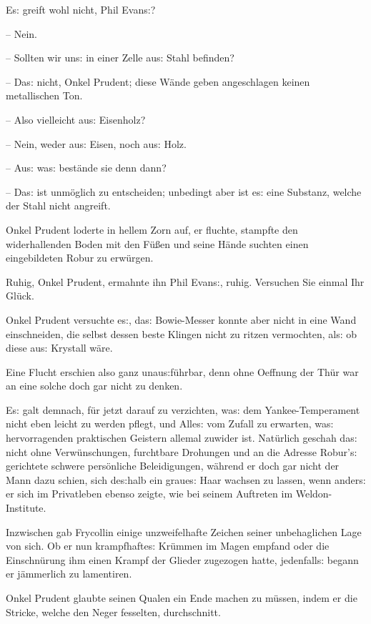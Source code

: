 \documentclass[oneside,12pt]{book}
\newcommand{\s}{s:}
\begin{document}
{\glqq}E{\s} greift wohl nicht, Phil Evan{\s}?

-- Nein.

-- Sollten wir un{\s} in einer Zelle au{\s} Stahl befinden?

-- Da{\s} nicht, Onkel Prudent; diese W\"ande geben angeschlagen
keinen metallischen Ton.

-- Also vielleicht au{\s} Eisenholz?

-- Nein, weder au{\s} Eisen, noch au{\s} Holz.

-- Au{\s} wa{\s} best\"ande sie denn dann?

-- Da{\s} ist unm\"oglich zu entscheiden; unbedingt aber ist e{\s}
eine Substanz, welche der Stahl nicht angreift.{\grqq}

Onkel Prudent loderte in hellem Zorn auf, er fluchte, stampfte den
widerhallenden Boden mit den F\"u{\ss}en und seine H\"ande suchten
einen eingebildeten Robur zu erw\"urgen.

{\glqq}Ruhig, Onkel Prudent, ermahnte ihn Phil Evan{\s}, ruhig.
Versuchen Sie einmal Ihr Gl\"uck.{\grqq}

Onkel Prudent versuchte e{\s}, da{\s} Bowie-Messer konnte aber nicht
in eine Wand einschneiden, die selbst dessen beste Klingen nicht zu
ritzen vermochten, al{\s} ob diese au{\s} Krystall w\"are.

Eine Flucht erschien also ganz unau{\s}f\"uhrbar, denn ohne Oeffnung
der Th\"ur war an eine solche doch gar nicht zu denken.

E{\s} galt demnach, f\"ur jetzt darauf zu verzichten, wa{\s} dem
Yankee-Temperament nicht eben leicht zu werden pflegt, und Alle{\s}
vom Zufall zu erwarten, wa{\s} hervorragenden praktischen Geistern
allemal zuwider ist. Nat\"urlich geschah da{\s} nicht ohne
Verw\"unschungen, furchtbare Drohungen und an die Adresse Robur'{\s}
gerichtete schwere pers\"onliche Beleidigungen, w\"ahrend er doch gar
nicht der Mann dazu schien, sich de{\s}halb ein graue{\s} Haar
wachsen zu lassen, wenn ander{\s} er sich im Privatleben ebenso
zeigte, wie bei seinem Auftreten im Weldon-Institute.

Inzwischen gab Frycollin einige unzweifelhafte Zeichen seiner
unbehaglichen Lage von sich. Ob er nun krampfhafte{\s} Kr\"ummen im
Magen empfand oder die Einschn\"urung ihm einen Krampf der Glieder
zugezogen hatte, jedenfall{\s} begann er j\"ammerlich zu lamentiren.

Onkel Prudent glaubte seinen Qualen ein Ende machen zu m\"ussen,
indem er die Stricke, welche den Neger fesselten, durchschnitt.
\end{document}
